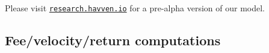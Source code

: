 




\noindent Please visit \href{http://research.havven.io}{\texttt{research.havven.io}} for a pre-alpha version of our model.

\subsection{Fee/velocity/return computations}

\pagebreak
